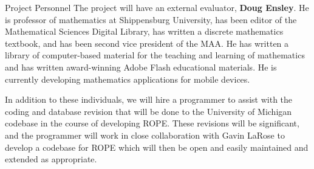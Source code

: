\documentclass[11pt]{article}
\begin{document}
\begin{section}{Project Personnel}
The project will have an external evaluator, \textbf{Doug Ensley}.
He is professor of mathematics at Shippensburg
University, has been editor of the Mathematical Sciences Digital Library,
has written a discrete mathematics textbook, and has been second vice
president of the MAA.  He has written a library of computer-based material
for the teaching and learning of mathematics and has written award-winning
Adobe Flash educational materials.  He is currently developing
mathematics applications for mobile devices.

In addition to these individuals, we will hire a programmer to assist with
the coding and database revision that will be done to the University of
Michigan codebase in the course of developing ROPE. These revisions
will be significant, and the programmer will work in close collaboration
with Gavin LaRose to develop a codebase for ROPE which will then be
open and easily maintained and extended as appropriate. 

\end{section}
\end{document}
